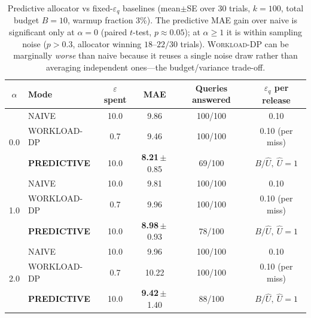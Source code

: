 \documentclass[sigconf,nonacm]{acmart}
\newcommand{\eps}{\varepsilon}
\begin{document}
\begin{table}[t]
\caption{Predictive allocator vs fixed-$\eps_q$ baselines (mean$\pm$SE over 30 trials, $k=100$, total budget $B=10$, warmup fraction 3\%). The predictive MAE gain over naive is significant only at $\alpha=0$ (paired $t$-test, $p\approx0.05$); at $\alpha\ge1$ it is within sampling noise ($p>0.3$, allocator winning $18$--$22/30$ trials). \textsc{Workload-DP} can be marginally \emph{worse} than naive because it reuses a single noise draw rather than averaging independent ones---the budget/variance trade-off.}
\label{tab:predictive}
\centering
\small
\begin{tabular}{c|l|cccc}
\toprule
$\alpha$ & Mode & $\eps$ spent & MAE & Queries answered & $\eps_q$ per release \\
\midrule
\multirow{3}{*}{0.0} & NAIVE      & 10.0  & 9.86 & 100/100 & 0.10 \\
                      & WORKLOAD-DP & 0.7   & 9.46 & 100/100 & 0.10 (per miss) \\
                      & \textbf{PREDICTIVE} & 10.0 & \textbf{8.21}\,$\pm$\,0.85 & 69/100 & $B/\hat U,\ \hat U{=}1$ \\
\midrule
\multirow{3}{*}{1.0} & NAIVE      & 10.0  & 9.81 & 100/100 & 0.10 \\
                      & WORKLOAD-DP & 0.7   & 9.96 & 100/100 & 0.10 (per miss) \\
                      & \textbf{PREDICTIVE} & 10.0 & \textbf{8.98}\,$\pm$\,0.93 & 78/100 & $B/\hat U,\ \hat U{=}1$ \\
\midrule
\multirow{3}{*}{2.0} & NAIVE      & 10.0  & 9.96 & 100/100 & 0.10 \\
                      & WORKLOAD-DP & 0.7   & 10.22 & 100/100 & 0.10 (per miss) \\
                      & \textbf{PREDICTIVE} & 10.0 & \textbf{9.42}\,$\pm$\,1.40 & 88/100 & $B/\hat U,\ \hat U{=}1$ \\
\bottomrule
\end{tabular}
\end{table}
\end{document}
